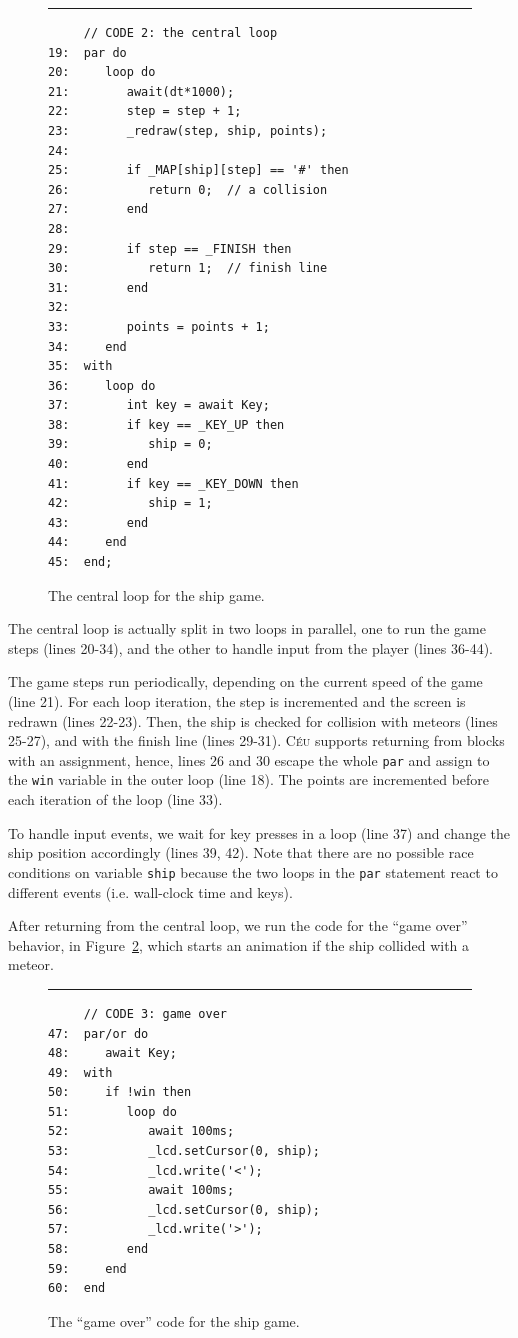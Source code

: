 \documentclass{sigplan-proc}
\newcommand{\2}{\;\;}
\newcommand{\5}{\;\;\;\;\;}
\newcommand{\CEU}{\textsc{C\'{e}u}}
\newcommand{\code}[1] {{\small{\texttt{#1}}}}
\begin{document}
\begin{figure}[t]
\rule{8.5cm}{0.37pt}
{\small
\begin{verbatim}
     // CODE 2: the central loop
19:  par do
20:     loop do
21:        await(dt*1000);
22:        step = step + 1;
23:        _redraw(step, ship, points);
24:
25:        if _MAP[ship][step] == '#' then
26:           return 0;  // a collision
27:        end
28:
29:        if step == _FINISH then
30:           return 1;  // finish line
31:        end
32:
33:        points = points + 1;
34:     end
35:  with
36:     loop do
37:        int key = await Key;
38:        if key == _KEY_UP then
39:           ship = 0;
40:        end
41:        if key == _KEY_DOWN then
42:           ship = 1;
43:        end
44:     end
45:  end;
\end{verbatim}
}
\caption{ The central loop for the ship game.
\label{lst:demos:ship:3}
}
\end{figure}

The central loop is actually split in two loops in parallel, one to run the 
game steps (lines 20-34), and the other to handle input from the player (lines 
36-44).

The game steps run periodically, depending on the current speed of the game 
(line 21).
For each loop iteration, the step is incremented and the screen is redrawn 
(lines 22-23).
Then, the ship is checked for collision with meteors (lines 25-27), and with 
the finish line (lines 29-31).
\CEU{} supports returning from blocks with an assignment, hence, lines 26 and 
30 escape the whole \code{par} and assign to the \code{win} variable in the 
outer loop (line 18).
The points are incremented before each iteration of the loop (line 33).

To handle input events, we wait for key presses in a loop (line 37) and change 
the ship position accordingly (lines 39, 42).
Note that there are no possible race conditions on variable \code{ship} because 
the two loops in the \code{par} statement react to different events (i.e. 
wall-clock time and keys).

After returning from the central loop, we run the code for the ``game over'' 
behavior, in Figure~\ref{lst:demos:ship:4}, which starts an animation if the 
ship collided with a meteor.

\begin{figure}[t]
\rule{8.5cm}{0.37pt}
{\small
\begin{verbatim}
     // CODE 3: game over
47:  par/or do
48:     await Key;
49:  with
50:     if !win then
51:        loop do
52:           await 100ms;
53:           _lcd.setCursor(0, ship);
54:           _lcd.write('<');
55:           await 100ms;
56:           _lcd.setCursor(0, ship);
57:           _lcd.write('>');
58:        end
59:     end
60:  end
\end{verbatim}
}
\caption{ The ``game over'' code for the ship game.
\label{lst:demos:ship:4}
}
\end{figure}
\end{document}
